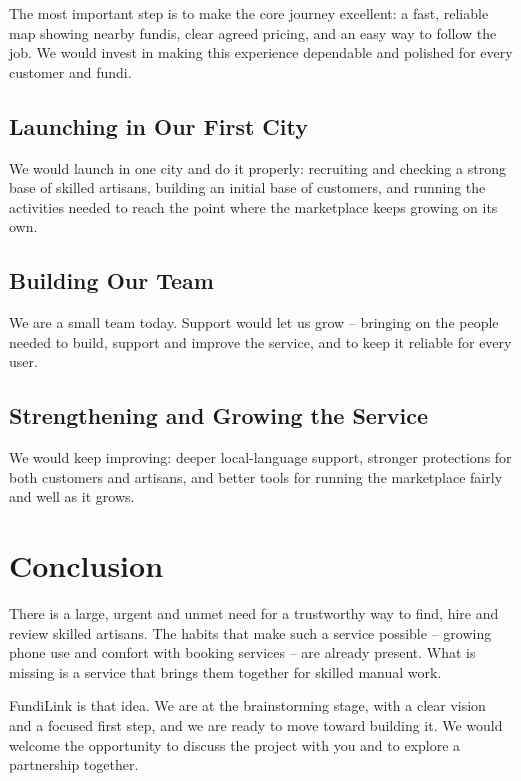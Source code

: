 \documentclass[11pt,a4paper]{article}
\begin{document}
The most important step is to make the core journey excellent: a fast, reliable map showing
nearby fundis, clear agreed pricing, and an easy way to follow the job. We would invest in
making this experience dependable and polished for every customer and fundi.

\subsection{Launching in Our First City}

We would launch in one city and do it properly: recruiting and checking a strong base of
skilled artisans, building an initial base of customers, and running the activities needed to
reach the point where the marketplace keeps growing on its own.

\subsection{Building Our Team}

We are a small team today. Support would let us grow -- bringing on the people needed to build,
support and improve the service, and to keep it reliable for every user.

\subsection{Strengthening and Growing the Service}

We would keep improving: deeper local-language support, stronger protections for both customers
and artisans, and better tools for running the marketplace fairly and well as it grows.

\section{Conclusion}

There is a large, urgent and unmet need for a trustworthy way to find, hire and review skilled
artisans. The habits that make such a service possible -- growing phone use and comfort with
booking services -- are already present. What is missing is a service that brings them
together for skilled manual work.

FundiLink is that idea. We are at the brainstorming stage, with a clear vision and a focused
first step, and we are ready to move toward building it. We would welcome the opportunity to
discuss the project with you and to explore a partnership together.
\end{document}
